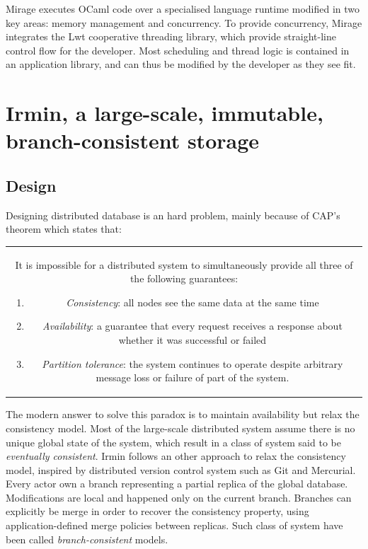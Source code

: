 \documentclass{article}
\renewcommand{\-}{\hyp}
\newcommand{\irmin}{Irmin\xspace}
\newcommand{\git}{Git\xspace}
\newcommand{\lwt}{Lwt\xspace}
\newcommand{\mercurial}{Mercurial\xspace}
\newcommand{\mirage}{Mirage\xspace}
\newcommand{\ocaml}{OCaml\xspace}
\begin{document}
\mirage executes \ocaml code over a specialised language runtime modified in two key areas: memory management and concurrency.
To provide concurrency, \mirage integrates the \lwt cooperative threading library, which provide straight-line control flow for the developer.
Most scheduling and thread logic is contained in an application library, and can thus be modified by the developer as they see fit\cite{LibraryOperatingSystemsCloud2013}.



\section{\irmin, a large-scale, immutable, branch-consistent storage}

\subsection{Design}

Designing distributed database is an hard problem, mainly because of CAP’s theorem\cite{BrewerConjecture2002} which states that:

\bigskip
\begin{tabular}{|c}
\begin{minipage}{0.9\textwidth}
It is impossible for a distributed system to simultaneously provide all three of the following guarantees:
\begin{enumerate}
	\item \emph{Consistency}: all nodes see the same data at the same time
	\item \emph{Availability}: a guarantee that every request receives a response about whether it was successful or failed
	\item \emph{Partition tolerance}: the system continues to operate despite arbitrary message loss or failure of part of the system.
\end{enumerate} 
\end{minipage}
\end{tabular}
\bigskip

The modern answer to solve this paradox is to maintain availability but relax the consistency model.
Most of the large-scale distributed system assume there is no unique global state of the system, which result in a class of system said to be \emph{eventually consistent}\cite{EventuallyConsistentTransactions2012}.
\irmin follows an other approach to relax the consistency model, inspired by distributed version control system such as \git and \mercurial.
Every actor own a branch representing a partial replica of the global database.
Modifications are local and happened only on the current branch.
Branches can explicitly be merge in order to recover the consistency property, using application-defined merge policies between replicas.
Such class of system have been called \emph{branch-consistent} models.
\end{document}
